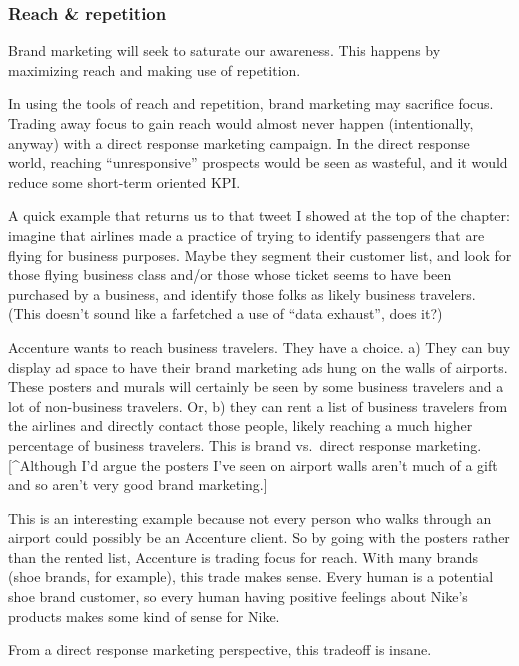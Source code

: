 \documentclass[13pt,]{tufte-handout}
\begin{document}
\hypertarget{reach-repetition}{%
\subsubsection{Reach \& repetition}\label{reach-repetition}}

Brand marketing will seek to saturate our awareness. This happens by
maximizing reach and making use of repetition.

In using the tools of reach and repetition, brand marketing may
sacrifice focus. Trading away focus to gain reach would almost never
happen (intentionally, anyway) with a direct response marketing
campaign. In the direct response world, reaching ``unresponsive''
prospects would be seen as wasteful, and it would reduce some short-term
oriented KPI.

A quick example that returns us to that tweet I showed at the top of the
chapter: imagine that airlines made a practice of trying to identify
passengers that are flying for business purposes. Maybe they segment
their customer list, and look for those flying business class and/or
those whose ticket seems to have been purchased by a business, and
identify those folks as likely business travelers. (This doesn't sound
like a farfetched a use of ``data exhaust'', does it?)

Accenture wants to reach business travelers. They have a choice. a) They
can buy display ad space to have their brand marketing ads hung on the
walls of airports. These posters and murals will certainly be seen by
some business travelers and a lot of non-business travelers. Or, b) they
can rent a list of business travelers from the airlines and directly
contact those people, likely reaching a much higher percentage of
business travelers. This is brand vs.~direct response marketing.
{[}\^{}Although I'd argue the posters I've seen on airport walls aren't
much of a gift and so aren't very good brand marketing.{]}

This is an interesting example because not every person who walks
through an airport could possibly be an Accenture client. So by going
with the posters rather than the rented list, Accenture is trading focus
for reach. With many brands (shoe brands, for example), this trade makes
sense. Every human is a potential shoe brand customer, so every human
having positive feelings about Nike's products makes some kind of sense
for Nike.

From a direct response marketing perspective, this tradeoff is insane.
\end{document}
